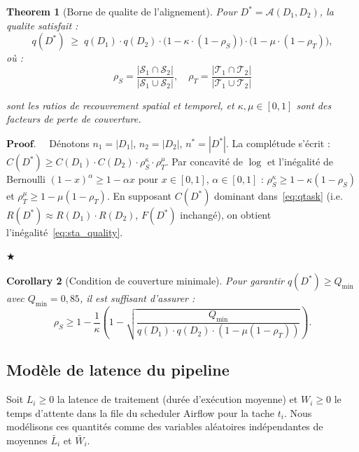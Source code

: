 \documentclass[12pt]{article}
\newtheorem{theorem}{Theorem}[section]
\newtheorem{corollary}[theorem]{Corollary}
\newenvironment{proof}{$\mathbf{Proof.\quad}$}{\begin{flushright}$\bigstar$\end{flushright}}
\begin{document}
\begin{theorem}[Borne de qualite de l'alignement]
	\label{thm:sta_quality}
	Pour $D^* = \mathcal{A}(D_1, D_2)$, la qualite satisfait :
	\begin{equation}
		q(D^*) \;\geq\;
		q(D_1) \cdot q(D_2) \cdot
		\bigl(1 - \kappa \cdot (1-\rho_S)\bigr)
		\cdot \bigl(1 - \mu \cdot (1-\rho_T)\bigr),
		\label{eq:sta_quality}
	\end{equation}
	où :
	\begin{equation*}
	\rho_S = \frac{|\mathcal{S}_1 \cap \mathcal{S}_2|}{|\mathcal{S}_1\cup\mathcal{S}_2|},
	\quad
	\rho_T = \frac{|\mathcal{T}_1 \cap \mathcal{T}_2|}{|\mathcal{T}_1\cup\mathcal{T}_2|}
	\end{equation*}
	
	sont les ratios de recouvrement spatial et temporel, et
	$\kappa, \mu \in [0,1]$ sont des facteurs de perte de couverture.
\end{theorem}
\begin{proof}
	Dénotons $n_1 = |D_1|$, $n_2 = |D_2|$, $n^* = |D^*|$.
	La complétude s'écrit :
	$C(D^*) \geq C(D_1)\cdot C(D_2) \cdot \rho_S^{\kappa} \cdot \rho_T^{\mu}$.
	Par concavité de $\log$ et l'inégalité de Bernoulli
	$(1-x)^\alpha \geq 1-\alpha x$ pour $x \in [0,1]$, $\alpha \in [0,1]$ :
	$\rho_S^{\kappa} \geq 1-\kappa(1-\rho_S)$
	et $\rho_T^{\mu} \geq 1-\mu(1-\rho_T)$.
	En supposant $C(D^*)$ dominant dans~\eqref{eq:qtask}
	(i.e. $R(D^*) \approx R(D_1)\cdot R(D_2)$, $F(D^*)$ inchangé),
	on obtient l'inégalité~\eqref{eq:sta_quality}.
\end{proof}
\begin{corollary}[Condition de couverture minimale]
\label{cor:coverage}
Pour garantir $q(D^*) \geq Q_{\min}$ avec $Q_{\min}=0{,}85$, il est
suffisant d'assurer :
\begin{equation}
	\rho_S \geq 1 - \frac{1}{\kappa}\left(1 -
	\sqrt{\frac{Q_{\min}}{q(D_1)\cdot q(D_2)\cdot (1-\mu(1-\rho_T))}}\right).
	\label{eq:coverage_cond}
\end{equation}
\end{corollary}
	\subsection{Modèle de latence du pipeline}
\label{subsec:latency}

Soit $L_i \geq 0$ la latence de traitement (durée d'exécution moyenne)
et $W_i \geq 0$ le temps d'attente dans la file du scheduler Airflow
pour la tache $t_i$. Nous modélisons ces quantités comme des variables
aléatoires indépendantes de moyennes $\bar L_i$ et $\bar W_i$.
\end{document}
